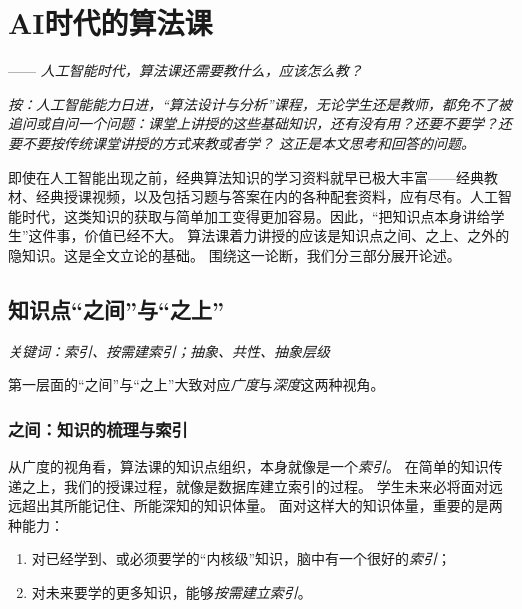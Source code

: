 \chapter{AI时代的算法课}
\begin{flushright}
    —— \textit{人工智能时代，算法课还需要教什么，应该怎么教？}
\end{flushright}

{\itshape
    按：人工智能能力日进，“算法设计与分析”课程，无论学生还是教师，都免不了被追问或自问一个问题：课堂上讲授的这些基础知识，还有没有用？还要不要学？还要不要按传统课堂讲授的方式来教或者学？
    这正是本文思考和回答的问题。
}


\medskip

即使在人工智能出现之前，经典算法知识的学习资料就早已极大丰富——经典教材、经典授课视频，以及包括习题与答案在内的各种配套资料，应有尽有。人工智能时代，这类知识的获取与简单加工变得更加容易。因此，“把知识点本身讲给学生”这件事，价值已经不大。
算法课着力讲授的应该是知识点之间、之上、之外的隐知识。这是全文立论的基础。
围绕这一论断，我们分三部分展开论述。

\section{知识点“之间”与“之上”}

\nid\textit{关键词：索引、按需建索引；抽象、共性、抽象层级}

\medskip

第一层面的“之间”与“之上”大致对应\textit{广度}与\textit{深度}这两种视角。

\subsection{之间：知识的梳理与索引}

从广度的视角看，算法课的知识点组织，本身就像是一个\textit{索引}。
在简单的知识传递之上，我们的授课过程，就像是数据库建立索引的过程。
学生未来必将面对远远超出其所能记住、所能深知的知识体量。
面对这样大的知识体量，重要的是两种能力：
\begin{enumerate}[label=\arabic*.]
    \item 对已经学到、或必须要学的“内核级”知识，脑中有一个很好的\textit{索引}；
    \item 对未来要学的更多知识，能够\textit{按需建立索引}。
\end{enumerate}

